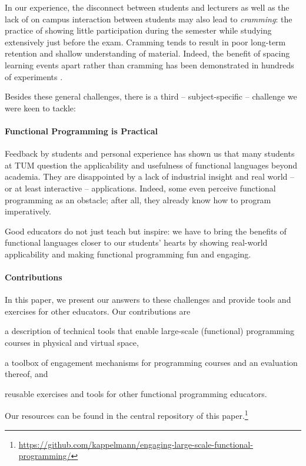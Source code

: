 In our experience, the disconnect between students and lecturers as well as the lack of on campus interaction between students may also lead to \emph{cramming}:
the practice of showing little participation during the semester
while studying extensively just before the exam.
Cramming tends to result in poor long-term retention and shallow understanding of material.
Indeed, the benefit of spacing learning events apart rather than cramming has been demonstrated in hundreds of experiments \cite{cramming1,cramming2}.

\vspace{0.5\baselineskip}\noindent
Besides these general challenges,
there is a third -- subject-specific --
challenge we were keen to tackle:

\paragraph{Functional Programming is Practical}
Feedback by students and personal experience has shown us that many students
at TUM question the applicability and usefulness
of functional languages beyond academia.
They are disappointed by a lack of industrial insight
and real world -- or at least interactive -- applications.
Indeed, some even perceive functional programming as an obstacle;
after all, they already know how to program imperatively.

Good educators do not just teach but inspire:
we have to bring the benefits of functional languages
closer to our students' hearts
by showing real-world applicability and making functional programming fun and engaging.

\paragraph{Contributions}

In this paper,
we present our answers to these challenges
and provide tools and exercises for other educators.
Our contributions are
\begin{enumerate*}[label=\arabic*)]
  \item a description of technical tools that enable large-scale (functional) programming courses in physical and virtual space,
  \item a toolbox of engagement mechanisms
for programming courses
and an evaluation thereof, and
  \item reusable exercises and tools for other functional programming educators.
\end{enumerate*}
Our resources can be found in the central repository of this paper.\footnote{\url{https://github.com/kappelmann/engaging-large-scale-functional-programming/}}

